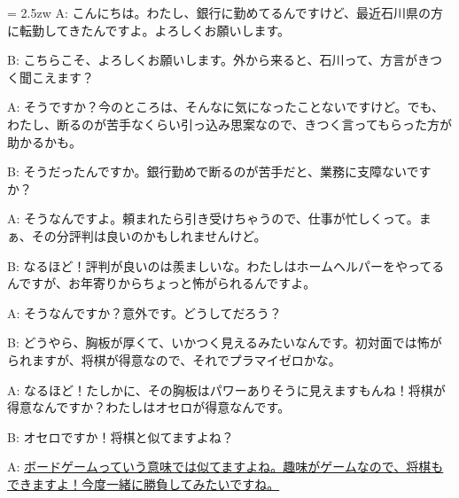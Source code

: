 \documentclass[11pt]{amsart}
\title{}
\author{}
\newenvironment{hangall}[1]{\hangindent = 2.5zw\everypar{\hangindent = 2.5zw}}{}
\begin{document}
\maketitle
\begin{hangall}{}%
A: こんにちは。わたし、銀行に勤めてるんですけど、最近石川県の方に転勤してきたんですよ。よろしくお願いします。

B: こちらこそ、よろしくお願いします。外から来ると、石川って、方言がきつく聞こえます？

A: そうですか？今のところは、そんなに気になったことないですけど。でも、わたし、断るのが苦手なくらい引っ込み思案なので、きつく言ってもらった方が助かるかも。

B: そうだったんですか。銀行勤めで断るのが苦手だと、業務に支障ないですか？

A: そうなんですよ。頼まれたら引き受けちゃうので、仕事が忙しくって。まぁ、その分評判は良いのかもしれませんけど。

B: なるほど！評判が良いのは羨ましいな。わたしはホームヘルパーをやってるんですが、お年寄りからちょっと怖がられるんですよ。

A: そうなんですか？意外です。どうしてだろう？

B: どうやら、胸板が厚くて、いかつく見えるみたいなんです。初対面では怖がられますが、将棋が得意なので、それでプラマイゼロかな。

A: なるほど！たしかに、その胸板はパワーありそうに見えますもんね！将棋が得意なんですか？わたしはオセロが得意なんです。

B: オセロですか！将棋と似てますよね？

A: \ul{ボードゲームっていう意味では似てますよね。趣味がゲームなので、将棋もできますよ！今度一緒に勝負してみたいですね。}\end{hangall}
\end{document}
